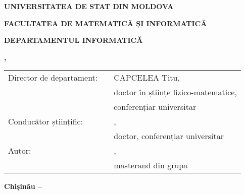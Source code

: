 \sloppy

\begin{titlepage}
  \vspace*{\fill}
  \begin{center}
      \vspace*{1cm}

      \large
      \uppercase{\textbf{UNIVERSITATEA DE STAT DIN MOLDOVA\\}}

      \normalsize
      \uppercase{\textbf{FACULTATEA DE MATEMATICĂ și INFORMATICĂ}}
      \vspace{0.1cm}

      \normalsize
      \uppercase{\textbf{DEPARTAMENTUL INFORMATICĂ}}
      \vspace{3.0cm}

      \large
      \textbf{\correctName{\authorName}}
      \vspace{1.5cm}

      \Large
      \textbf{\MakeUppercase{\thesisTitle}}
      \vspace{0.75cm}

      \large
      \textbf{\MakeUppercase{\identificatorulCursului}, \programulDeStudii}
      \vspace{0.5cm}

      \normalsize
      \textbf{}
  
    \end{center}
  \vfill

  \normalsize
  
  \begin{flushleft}
    \newcommand{\signatureField}{\textUnderLine{4cm}{(semnătură)}}

    \begin{tabular}{p{4.3cm} p{4cm} p{8cm}}
      Director de departament: & \signatureField{} & CAPCELEA Titu, \\
                               &                   & doctor în științe fizico-matematice, \\
                               &                   & conferențiar universitar \\
      Conducător științific:   & \signatureField{} & \correctName{\conducatorName}, \\
                               &                   & doctor, conferențiar universitar \\
      Autor:                   & \signatureField{} & \correctName{\authorName}, \\
                               &                   & masterand din grupa \uniGroupName{} \\
    \end{tabular}
      
  \end{flushleft}

  \vspace{1cm}

  \begin{center}
      \textbf{Chișinău -- \year{}}
  \end{center}

\end{titlepage}
